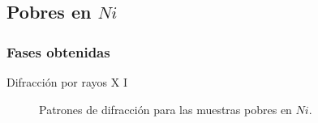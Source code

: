 \documentclass[11pt]{beamer}
\begin{document}
	\subsection{Pobres en $Ni$}
		\subsubsection{Fases obtenidas}
			\begin{frame}{Difracción por rayos X I}
				\begin{figure}[H]
					\captionsetup[subfloat]{labelformat=empty}
					 \qquad
					\caption*{Patrones de difracción para las muestras pobres en $Ni$.}
					\label{RXNiPoor}
				\end{figure}		
			\end{frame}
			
\end{document}
